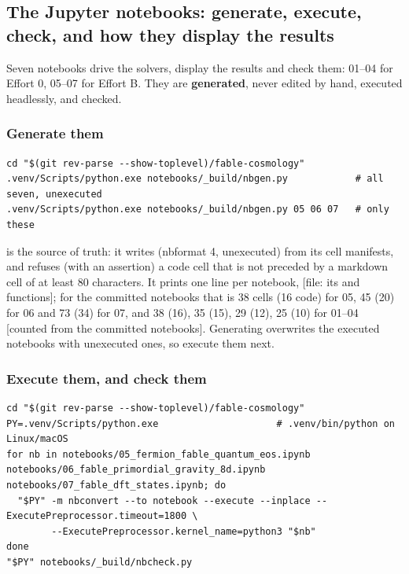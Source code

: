 \subsection{The Jupyter notebooks: generate, execute, check, and how they display the results}
\label{sec:6.7}

Seven notebooks drive the solvers, display the results and check them: 01--04 for Effort 0, 05--07 for Effort B. They are \textbf{generated}, never edited by hand, executed headlessly, and checked.

\subsubsection{Generate them}
\label{sec:6.7.1}

\begin{Verbatim}
cd "$(git rev-parse --show-toplevel)/fable-cosmology"
.venv/Scripts/python.exe notebooks/_build/nbgen.py            # all seven, unexecuted
.venv/Scripts/python.exe notebooks/_build/nbgen.py 05 06 07   # only these
\end{Verbatim}

 is the source of truth: it writes  (nbformat 4, unexecuted) from its cell manifests, and refuses (with an assertion) a code cell that is not preceded by a markdown cell of at least 80 characters. It prints one line per notebook,  [file: its  and  functions]; for the committed notebooks that is 38 cells (16 code) for 05, 45 (20) for 06 and 73 (34) for 07, and 38 (16), 35 (15), 29 (12), 25 (10) for 01--04 [counted from the committed notebooks]. Generating overwrites the executed notebooks with unexecuted ones, so execute them next.

\subsubsection{Execute them, and check them}
\label{sec:6.7.2}

\begin{Verbatim}
cd "$(git rev-parse --show-toplevel)/fable-cosmology"
PY=.venv/Scripts/python.exe                     # .venv/bin/python on Linux/macOS
for nb in notebooks/05_fermion_fable_quantum_eos.ipynb notebooks/06_fable_primordial_gravity_8d.ipynb notebooks/07_fable_dft_states.ipynb; do
  "$PY" -m nbconvert --to notebook --execute --inplace --ExecutePreprocessor.timeout=1800 \
        --ExecutePreprocessor.kernel_name=python3 "$nb"
done
"$PY" notebooks/_build/nbcheck.py
\end{Verbatim}

